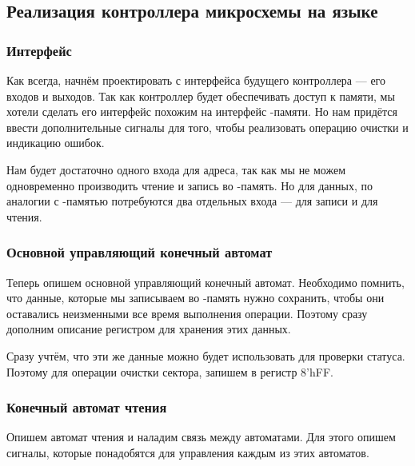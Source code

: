 \subsection{Реализация контроллера микросхемы  на языке }
\subsubsection{Интерфейс}
\par{Как всегда, начнём проектировать с интерфейса будущего контроллера --- его входов и выходов. Так как контроллер будет обеспечивать доступ к памяти, мы хотели сделать его интерфейс похожим на интерфейс -памяти. Но нам придётся ввести дополнительные сигналы для того, чтобы реализовать операцию очистки и индикацию ошибок.}
\par{Нам будет достаточно одного входа для адреса, так как мы не можем одновременно производить чтение и запись во -память. Но для данных, по аналогии с -памятью потребуются два отдельных входа --- для записи и для чтения.}

\noindent
  

\subsubsection{Основной управляющий конечный автомат}
\par{Теперь опишем основной управляющий конечный автомат. Необходимо помнить, что данные, которые мы записываем во -память нужно сохранить, чтобы они оставались неизменными все время выполнения операции. Поэтому сразу дополним описание регистром для хранения этих данных.}
\par{Сразу учтём, что эти же данные можно будет использовать для проверки статуса. Поэтому для операции очистки сектора, запишем в регистр 8'hFF.}
\noindent
  

\pagebreak
\subsubsection{Конечный автомат чтения}
\par{Опишем автомат чтения и наладим связь между автоматами. Для этого опишем сигналы, которые понадобятся для управления каждым из этих автоматов.}

